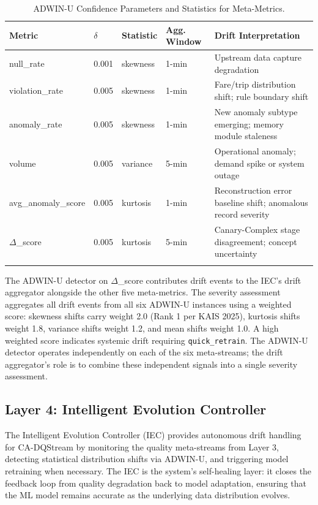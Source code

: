 \begin{longtable}{|m{2.0cm}|M{1.3cm}|M{1.3cm}|M{1.5cm}|m{5.0cm}|}
\hline
\textbf{Metric} & \textbf{$\delta$} & \textbf{Statistic} & \textbf{Agg. Window} & \textbf{Drift Interpretation} \\ \hline
null\_rate & 0.001 & skewness & 1-min & Upstream data capture degradation \\ \hline
violation\_rate & 0.005 & skewness & 1-min & Fare/trip distribution shift; rule boundary shift \\ \hline
anomaly\_rate & 0.005 & skewness & 1-min & New anomaly subtype emerging; memory module staleness \\ \hline
volume & 0.005 & variance & 5-min & Operational anomaly; demand spike or system outage \\ \hline
avg\_anomaly\_score & 0.005 & kurtosis & 1-min & Reconstruction error baseline shift; anomalous record severity \\ \hline
$\Delta$\_score & 0.005 & kurtosis & 5-min & Canary-Complex stage disagreement; concept uncertainty \\ \hline
\caption{ADWIN-U Confidence Parameters and Statistics for Meta-Metrics.}
\label{tab:adwin_params_v2}
\end{longtable}

The ADWIN-U detector on $\Delta$\_score contributes drift events to the IEC's drift aggregator alongside the other five meta-metrics. The severity assessment aggregates all drift events from all six ADWIN-U instances using a weighted score: skewness shifts carry weight 2.0 (Rank 1 per KAIS 2025), kurtosis shifts weight 1.8, variance shifts weight 1.2, and mean shifts weight 1.0. A high weighted score indicates systemic drift requiring \texttt{quick\_retrain}. The ADWIN-U detector operates independently on each of the six meta-streams; the drift aggregator's role is to combine these independent signals into a single severity assessment.

\subsection{Layer 4: Intelligent Evolution Controller}

The Intelligent Evolution Controller (IEC) provides autonomous drift handling for CA-DQStream by monitoring the quality meta-streams from Layer 3, detecting statistical distribution shifts via ADWIN-U, and triggering model retraining when necessary. The IEC is the system's self-healing layer: it closes the feedback loop from quality degradation back to model adaptation, ensuring that the ML model remains accurate as the underlying data distribution evolves.

